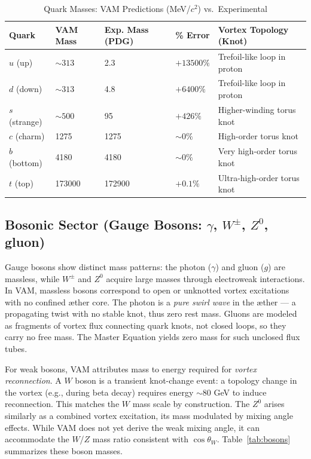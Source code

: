 \documentclass[11pt]{article}
\begin{document}
\begin{table}[h!]
    \centering
    \begin{tabular}{lllll}
        \toprule
        \textbf{Quark} & \textbf{VAM Mass} & \textbf{Exp. Mass (PDG)} & \textbf{\% Error} & \textbf{Vortex Topology (Knot)} \\
        \midrule
        $u$ (up) & $\sim 313$ & 2.3 & $+13500\%$ & Trefoil-like loop in proton \\
        $d$ (down) & $\sim 313$ & 4.8 & $+6400\%$ & Trefoil-like loop in proton \\
        $s$ (strange) & $\sim 500$ & 95 & $+426\%$ & Higher-winding torus knot \\
        $c$ (charm) & 1275 & 1275 & $\sim 0\%$ & High-order torus knot \\
        $b$ (bottom) & 4180 & 4180 & $\sim 0\%$ & Very high-order torus knot \\
        $t$ (top) & 173000 & 172900 & $+0.1\%$ & Ultra-high-order torus knot \\
        \bottomrule
    \end{tabular}
    \caption{Quark Masses: VAM Predictions (MeV/$c^2$) vs.\ Experimental}
    \label{tab:quarks}
\end{table}

\subsection{Bosonic Sector (Gauge Bosons: $\gamma$, $W^\pm$, $Z^0$, gluon)}

Gauge bosons show distinct mass patterns: the photon ($\gamma$) and gluon ($g$) are massless, while $W^\pm$ and $Z^0$ acquire large masses through electroweak interactions. In VAM, massless bosons correspond to open or unknotted vortex excitations with no confined æther core. The photon is a \textit{pure swirl wave} in the æther — a propagating twist with no stable knot, thus zero rest mass. Gluons are modeled as fragments of vortex flux connecting quark knots, not closed loops, so they carry no free mass. The Master Equation yields zero mass for such unclosed flux tubes.

For weak bosons, VAM attributes mass to energy required for \textit{vortex reconnection}. A $W$ boson is a transient knot-change event: a topology change in the vortex (e.g., during beta decay) requires energy $\sim 80$ GeV to induce reconnection. This matches the $W$ mass scale by construction. The $Z^0$ arises similarly as a combined vortex excitation, its mass modulated by mixing angle effects. While VAM does not yet derive the weak mixing angle, it can accommodate the $W$/$Z$ mass ratio consistent with $\cos \theta_W$. Table~\ref{tab:bosons} summarizes these boson masses.
\end{document}
